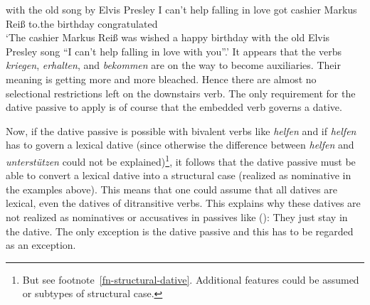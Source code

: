      with the old song   by  Elvis Presley I can't help falling in love got cashier Markus Reiß to.the birthday congratulated\\
\glt `The cashier Markus Reiß was wished a happy birthday with the old Elvis Presley song ``I can't help falling in love with you''.'
\zl
It appears that the verbs \emph{kriegen}, \emph{erhalten}, and \emph{bekommen} are on the way to become
auxiliaries. Their meaning is getting more and more bleached. Hence there are almost no selectional
restrictions left on the downstairs verb. The only requirement for the dative passive to apply is of
course that the embedded verb governs a dative.

Now, if the dative passive is possible with bivalent verbs like \emph{helfen} and if \emph{helfen}
has to govern a lexical dative (since otherwise the difference between \emph{helfen} and
\emph{unterstützen} could not be explained)\footnote{%
  But see footnote~\ref{fn-structural-dative}. Additional features could be assumed or subtypes of
  structural case.}, 
it follows that the dative passive must be able to
convert a lexical dative into a structural case (realized as nominative in the examples above). This
means that one could assume that all datives are lexical, even the datives of ditransitive
verbs. This explains why these datives are not realized as nominatives or accusatives in passives
like ():
\eal
{}
\zl
They just stay in the dative. The only exception is the dative passive and this has to be regarded as an exception.





